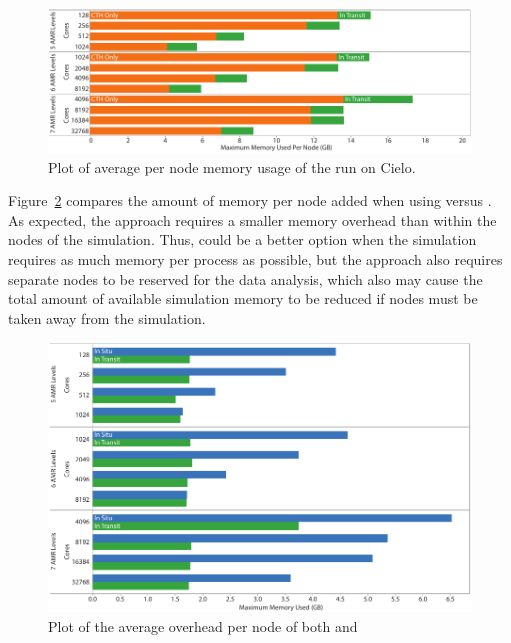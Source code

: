 \begin{figure}[htb]
  \centering
  \includegraphics[width=\linewidth]{figures/MemoryUsageInTransitPerNode}
  \caption{Plot of average per node memory usage of the \intransit run on Cielo.}
  \label{fig:MemoryInTransitPerNode}
\end{figure}

Figure~\ref{fig:MemoryCompare} compares the amount of memory per node added
when using \insitu versus \intransit.  As expected, the \intransit approach
requires a smaller memory overhead than \insitu within the nodes of the
simulation.  Thus, \intransit could be a better option when the simulation
requires as much memory per process as possible, but the \intransit
approach also requires separate nodes to be reserved for the data analysis,
which also may cause the total amount of available simulation memory to be
reduced if nodes must be taken away from the simulation.

\begin{figure}[htb]
  \centering
  \includegraphics[width=\linewidth]{figures/MemoryUsageCompare}
  \caption{Plot of the average overhead per node of both \insitu and \intransit}
  \label{fig:MemoryCompare}
\end{figure}


